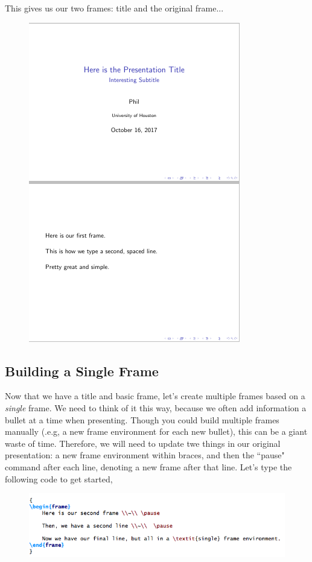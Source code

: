 \documentclass[11pt]{article}
\newcommand{\forceindent}{\leavevmode{\parindent=1.5em\indent}} %
\begin{document}
This gives us our two frames: title and the original frame...

\begin{figure}[!h]
	\includegraphics[scale=.6]{OUT3}
	\centering
\end{figure}

\newpage

\subsection{Building a Single Frame}

\forceindent Now that we have a title and basic frame, let's create multiple frames based on a \textit{single} frame. We need to think of it this way, because we often add information a bullet at a time when presenting. Though you could build multiple frames manually (.e.g, a new frame environment for each new bullet), this can be a giant waste of time. Therefore, we will need to update twe things in our original presentation: a new frame environment within braces, and then the ``pause" command after each line, denoting a new frame after that line. Let's type the following code to get started,

\begin{figure}[!h]
	\includegraphics[scale=.6]{CODE4}
	\centering
\end{figure}
\end{document}
